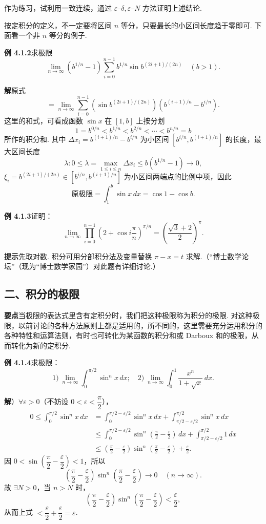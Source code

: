 \documentclass[UTF8,12pt,a4paper,fontset=fandol]{ctexart}
\begin{document}
作为练习，试利用一致连续，通过 $\varepsilon$--$\delta,\varepsilon$--$N$ 方法证明上述结论.

按定积分的定义，不一定要将区间 $n$ 等分，只要最长的小区间长度趋于零即可. 下面看一个非 $n$ 等分的例子.

\noindent\textbf{例 4.1.2}\quad 求极限
\[
\lim_{n\to\infty}\left(b^{1/n}-1\right)
\sum_{i=0}^{n-1} b^{1/n}\sin b^{(2i+1)/(2n)}
\quad(b>1).
\]

\noindent\textbf{解}\quad 原式
\[
=\lim_{n\to\infty}\sum_{i=0}^{n-1}
\left(\sin b^{(2i+1)/(2n)}\right)
\left(b^{(i+1)/n}-b^{i/n}\right).
\]
这里的和式，可看成函数 $\sin x$ 在 $[1,b]$ 上按分划
\[
1=b^{0/n}<b^{1/n}<b^{2/n}<\cdots<b^{n/n}=b
\]
所作的积分和. 其中 $\Delta x_i=b^{(i+1)/n}-b^{i/n}$ 为小区间
$[b^{i/n},b^{(i+1)/n}]$ 的长度，最大区间长度
\[
\lambda:0\le\lambda=\max_{1\le i\le n}\Delta x_i\le b\left(b^{1/n}-1\right)\to0,
\]
$\xi_i=b^{(2i+1)/(2n)}\in[b^{i/n},b^{(i+1)/n}]$ 为小区间两端点的比例中项，因此
\[
\text{原极限}=\int_1^b\sin x\,dx=\cos1-\cos b.
\]

\noindent\textbf{例 4.1.3}\quad 证明：
\[
\lim_{n\to\infty}\prod_{i=0}^{n-1}\left(2+\cos i\frac\pi n\right)^{\pi/n}
=\left(\frac{\sqrt3+2}{2}\right)^\pi.
\]

\noindent\textbf{提示}\quad 先取对数. 积分可用分部积分法及变量替换 $\pi-x=t$ 求解.（“博士数学论坛”（现为“博士数学家园”）对此题有详细讨论.）

\subsection*{二、积分的极限}

\noindent\textbf{要点}\quad 当极限的表达式里含有定积分时，我们把这种极限称为积分的极限. 对这种极限，以前讨论的各种方法原则上都是适用的，所不同的，这里需要充分运用积分的各种特性和运算法则，有时也可转化为某函数的积分和或 Darboux 和的极限，从而转化为新的定积分.

\noindent\textbf{例 4.1.4}\quad 求极限：
\[
1)\ \lim_{n\to\infty}\int_0^{\pi/2}\sin^n x\,dx;\quad
2)\ \lim_{n\to\infty}\int_0^1\frac{x^n}{1+\sqrt{x}}\,dx.
\]

\noindent\textbf{解}）$\forall\varepsilon>0$（不妨设 $0<\varepsilon<\dfrac\pi2$），
\[
\begin{aligned}
0\le\int_0^{\pi/2}\sin^n x\,dx
&=\int_0^{\pi/2-\varepsilon/2}\sin^n x\,dx
+\int_{\pi/2-\varepsilon/2}^{\pi/2}\sin^n x\,dx\\
&\le\int_0^{\pi/2-\varepsilon/2}
\sin^n\left(\frac\pi2-\frac\varepsilon2\right)\,dx
+\int_{\pi/2-\varepsilon/2}^{\pi/2}1\,dx\\
&\le\left(\frac\pi2-\frac\varepsilon2\right)
\sin^n\left(\frac\pi2-\frac\varepsilon2\right)+\frac\varepsilon2.
\end{aligned}
\]
因 $0<\sin\left(\dfrac\pi2-\dfrac\varepsilon2\right)<1$，所以
\[
\left(\frac\pi2-\frac\varepsilon2\right)
\sin^n\left(\frac\pi2-\frac\varepsilon2\right)\to0\quad(n\to\infty).
\]
故 $\exists N>0$，当 $n>N$ 时，
\[
\left(\frac\pi2-\frac\varepsilon2\right)
\sin^n\left(\frac\pi2-\frac\varepsilon2\right)<\frac\varepsilon2,
\]
从而上式 $<\dfrac\varepsilon2+\dfrac\varepsilon2=\varepsilon$.
\end{document}
